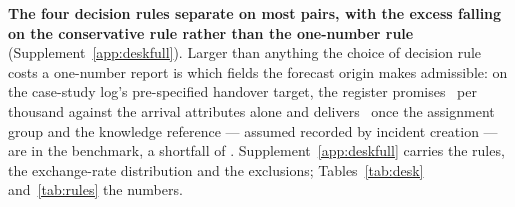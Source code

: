 \textbf{The four decision rules separate on most pairs, with the excess
falling on the conservative rule rather than the one-number rule}
(Supplement~\ref{app:deskfull}). Larger than anything the choice of decision
rule costs a one-number report is which fields the forecast origin makes
admissible: on the case-study log's pre-specified handover target, the
register promises \promisedPerThousand\ per thousand against the arrival
attributes alone and delivers \deliveredPerThousand\ once the assignment
group and the knowledge reference --- assumed recorded by incident creation
--- are in the benchmark, a shortfall of \shortfallPerThousand. Supplement~\ref{app:deskfull} carries the rules, the
exchange-rate distribution and the exclusions; Tables~\ref{tab:desk}
and~\ref{tab:rules} the numbers.
